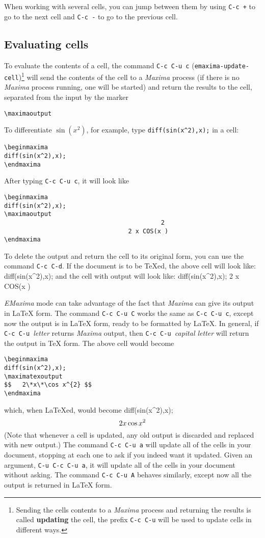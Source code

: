 \documentclass{article}
\newcommand{\emx}{\textsl{\sffamily EMaxima}}
\newcommand{\mx}{\textsl{\sffamily Maxima}}
\begin{document}
When working with several cells, you can jump between them by using
\texttt{C-c +} to go to the next cell and \texttt{C-c -} to go to the
previous cell.

\subsection{Evaluating cells}

\noindent
To evaluate the contents of a cell, the command
\texttt{C-c C-u c} (\texttt{emaxima-update-cell})\footnote{Sending the
  cells contents to a \mx{} process and returning the results is
  called \textbf{updating} the cell, the prefix 
\texttt{C-c C-u} will be used to update cells in different ways.} 
will send the contents
of the cell to a \mx{} process (if there is no \mx{} process running,
one will be started) and return the results to the cell,
separated from the input by the marker
\begin{verbatim}
\maximaoutput
\end{verbatim}
\noindent
To differentiate
$\sin(x^2)$, for example, type 
\texttt{diff(sin(x\^{}2),x);} in a cell:
\begin{verbatim}
\beginmaxima
diff(sin(x^2),x);
\endmaxima
\end{verbatim}
\noindent
After typing \texttt{C-c C-u c}, it will look like
\begin{verbatim}
\beginmaxima
diff(sin(x^2),x);
\maximaoutput
                                           2
                                  2 x COS(x )
\endmaxima
\end{verbatim}
\noindent
To delete the output and return the cell to its original form, you can
use the command \texttt{C-c C-d}.
If the document is to be \TeX{}ed, the above cell will look like:
\beginmaxima
diff(sin(x^2),x);
\endmaxima
and the cell with output will look like:
\beginmaxima
diff(sin(x^2),x);
                                  2 x COS(x )
\endmaxima

\emx{} mode can take advantage of the fact that \mx{} can give its
output in \LaTeX{} form.  The command \texttt{C-c C-u C}
works the same as \texttt{C-c C-u c}, except now the output is in \LaTeX{}
form, ready to be formatted by \LaTeX{}.  In general, if 
\texttt{C-c C-u }\textsl{letter} returns \mx{} output, then
\texttt{C-c C-u }\textsl{capital letter} will return the output in
\TeX{} form.  The above cell would become
\begin{verbatim}
\beginmaxima
diff(sin(x^2),x);
\maximatexoutput
$$   2\*x\*\cos x^{2} $$
\endmaxima
\end{verbatim}
\noindent
which, when \LaTeX{}ed, would become
\beginmaxima
diff(sin(x^2),x);
\maximatexoutput
\[   2\*x\*\cos x^{2} \]
\endmaxima
\noindent
(Note that whenever a cell is updated, any old output is discarded and
replaced with new output.)  The command \texttt{C-c C-u a} will update all
of the cells in your document, 
stopping at each one to ask if you indeed want it updated.  Given an
argument, \texttt{C-u C-c C-u a}, it will update all of the cells in your
document without asking.  The command \texttt{C-c C-u A} behaves
similarly, except now all the output is returned in \LaTeX{}  form.
\end{document}
